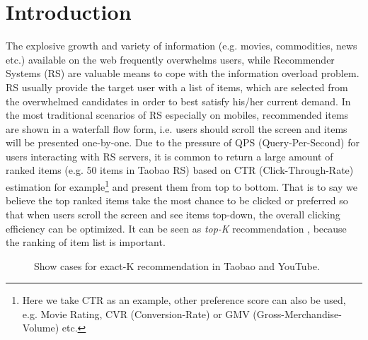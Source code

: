 \section{Introduction}
\label{sec:intro}
The explosive growth and variety of information (e.g. movies, commodities, news etc.) available on the web frequently overwhelms users,
while Recommender Systems (RS) are valuable means to cope with the information overload problem. 
RS usually provide the target user with a list of items,
which are selected from the overwhelmed candidates
in order to best satisfy his/her current demand.
In the most traditional scenarios of RS especially on mobiles,
recommended items are shown in a waterfall flow form,
i.e. users should scroll the screen and items will be presented one-by-one.
Due to the pressure of QPS (Query-Per-Second) for users interacting with RS servers, it is common to return a large amount of ranked items
(e.g. 50 items in Taobao RS)
based on CTR (Click-Through-Rate) estimation for example\footnote{Here we take CTR as an example, other preference score can also be used, e.g. Movie Rating, CVR (Conversion-Rate) or GMV (Gross-Merchandise-Volume) etc.} and present them from top to bottom.
That is to say we believe the top ranked items take the most chance to be clicked or preferred so that when users scroll the screen and see items top-down,
the overall clicking efficiency can be optimized.
It can be seen as \emph{top-K} recommendation \cite{cremonesi2010performance}, because the ranking of item list is important.
\begin{figure*}[th]
	\centering
	\caption{Show cases for exact-K recommendation in Taobao and YouTube.}
	\label{fig:exactk_demo}
\end{figure*}

